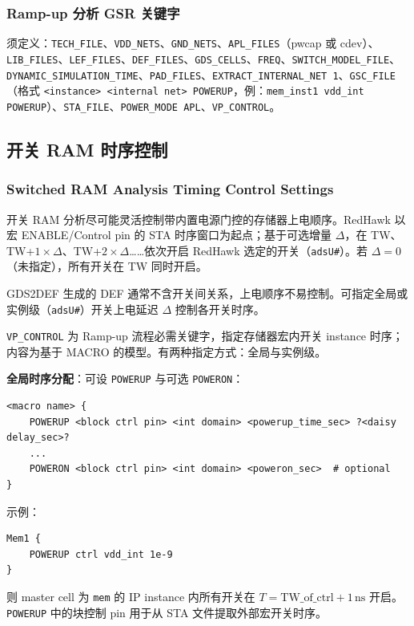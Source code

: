 
\subsubsection{Ramp-up 分析 GSR 关键字}
须定义：\texttt{TECH\_FILE}、\texttt{VDD\_NETS}、\texttt{GND\_NETS}、\texttt{APL\_FILES}（pwcap 或 cdev）、\texttt{LIB\_FILES}、\texttt{LEF\_FILES}、\texttt{DEF\_FILES}、\texttt{GDS\_CELLS}、\texttt{FREQ}、\texttt{SWITCH\_MODEL\_FILE}、\texttt{DYNAMIC\_SIMULATION\_TIME}、\texttt{PAD\_FILES}、\texttt{EXTRACT\_INTERNAL\_NET 1}、\texttt{GSC\_FILE}（格式 \texttt{<instance> <internal net> POWERUP}，例：\texttt{mem\_inst1 vdd\_int POWERUP}）、\texttt{STA\_FILE}、\texttt{POWER\_MODE APL}、\texttt{VP\_CONTROL}。

\subsection{开关 RAM 时序控制}
\subsubsection*{Switched RAM Analysis Timing Control Settings}

开关 RAM 分析尽可能灵活控制带内置电源门控的存储器上电顺序。RedHawk 以宏 ENABLE/Control pin 的 STA 时序窗口为起点；基于可选增量 $\Delta$，在 TW、TW+$1\times\Delta$、TW+$2\times\Delta$……依次开启 RedHawk 选定的开关（\texttt{adsU\#}）。若 $\Delta=0$（未指定），所有开关在 TW 同时开启。

GDS2DEF 生成的 DEF 通常不含开关间关系，上电顺序不易控制。可指定全局或实例级（\texttt{adsU\#}）开关上电延迟 $\Delta$ 控制各开关时序。

\texttt{VP\_CONTROL} 为 Ramp-up 流程必需关键字，指定存储器宏内开关 instance 时序；内容为基于 MACRO 的模型。有两种指定方式：全局与实例级。

\textbf{全局时序分配}：可设 \texttt{POWERUP} 与可选 \texttt{POWERON}：
\begin{lstlisting}
<macro name> {
    POWERUP <block ctrl pin> <int domain> <powerup_time_sec> ?<daisy delay_sec>?
    ...
    POWERON <block ctrl pin> <int domain> <poweron_sec>  # optional
}
\end{lstlisting}

示例：
\begin{lstlisting}
Mem1 {
    POWERUP ctrl vdd_int 1e-9
}
\end{lstlisting}
则 master cell 为 \texttt{mem} 的 IP instance 内所有开关在 $T = \mathrm{TW\_of\_ctrl} + 1\,\mathrm{ns}$ 开启。\texttt{POWERUP} 中的块控制 pin 用于从 STA 文件提取外部宏开关时序。

